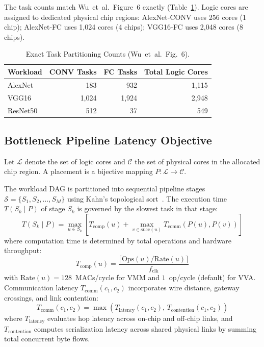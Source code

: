 \documentclass[10pt,conference]{IEEEtran}
\begin{document}
The task counts match Wu~et~al.\ Figure~6 exactly (Table~\ref{tab:workload-tasks}). Logic cores are assigned to dedicated physical chip regions: AlexNet-CONV uses 256 cores (1 chip); AlexNet-FC uses 1,024 cores (4 chips); VGG16-FC uses 2,048 cores (8 chips).

\begin{table}[t]
  \caption{Exact Task Partitioning Counts (Wu~et~al.\ Fig.~6).}
  \label{tab:workload-tasks}
  \centering
  \footnotesize
  \setlength{\tabcolsep}{6pt}
  \begin{tabular}{lrrr}
    \toprule
    Workload & CONV Tasks & FC Tasks & Total Logic Cores \\
    \midrule
    AlexNet  & 183 & 932 & 1,115 \\
    VGG16    & 1,024 & 1,924 & 2,948 \\
    ResNet50 & 512 & 37 & 549 \\
    \bottomrule
  \end{tabular}
\end{table}

\subsection{Bottleneck Pipeline Latency Objective}
Let $\mathcal{L}$ denote the set of logic cores and $\mathcal{C}$ the set of physical cores in the allocated chip region. A placement is a bijective mapping $P : \mathcal{L} \to \mathcal{C}$.

The workload DAG is partitioned into sequential pipeline stages $\mathcal{S} = \{S_1, S_2, \ldots, S_M\}$ using Kahn's topological sort~\cite{kahn1962topological}. The execution time $T(S_k \mid P)$ of stage $S_k$ is governed by the slowest task in that stage:
\begin{equation}
  T(S_k \mid P) = \max_{u \in S_k} \left[ T_{\text{comp}}(u) + \max_{v \in \text{succ}(u)} T_{\text{comm}}(P(u), P(v)) \right]
  \label{eq:stage-latency}
\end{equation}
where computation time is determined by total operations and hardware throughput:
\begin{equation}
  T_{\text{comp}}(u) = \frac{\lceil \text{Ops}(u) / \text{Rate}(u) \rceil}{f_{\text{clk}}}
\end{equation}
with $\text{Rate}(u) = 128$~MACs/cycle for VMM and $1$~op/cycle (default) for VVA. Communication latency $T_{\text{comm}}(c_1, c_2)$ incorporates wire distance, gateway crossings, and link contention:
\begin{equation}
  T_{\text{comm}}(c_1, c_2) = \max \left( T_{\text{latency}}(c_1, c_2), \, T_{\text{contention}}(c_1, c_2) \right)
\end{equation}
where $T_{\text{latency}}$ evaluates hop latency across on-chip and off-chip links, and $T_{\text{contention}}$ computes serialization latency across shared physical links by summing total concurrent byte flows.
\end{document}
